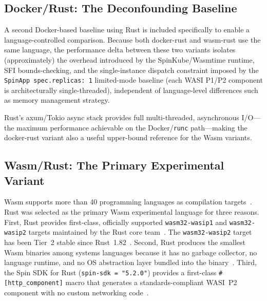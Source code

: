 \subsection{Docker/Rust: The Deconfounding Baseline}

\begin{sloppypar}
A second Docker-based baseline using Rust is included specifically to enable a language-controlled comparison. Because both docker-rust and wasm-rust use the same language, the performance delta between these two variants isolates (approximately) the overhead introduced by the SpinKube/Wasmtime runtime, \acs{SFI} bounds-checking, and the single-instance dispatch constraint imposed by the \texttt{SpinApp~spec.replicas:~1} limited-mode baseline (each \acs{WASI} P1/P2 component is architecturally single-threaded), independent of language-level differences such as memory management strategy.
\end{sloppypar}

\begin{sloppypar}
Rust's axum/Tokio async stack provides full multi-threaded, asynchronous I/O---the maximum performance achievable on the Docker/\texttt{runc} path---making the docker-rust variant also a useful upper-bound reference for the \acs{Wasm} variants.
\end{sloppypar}

\subsection{Wasm/Rust: The Primary Experimental Variant}

\begin{sloppypar}
\acs{Wasm} supports more than 40 programming languages as compilation targets~\cite{fermyon2024langmatrix}. Rust was selected as the primary \acs{Wasm} experimental language for three reasons. First, Rust provides first-class, officially supported \texttt{wasm32-wasip1} and \texttt{wasm32-wasip2} targets maintained by the Rust core team~\cite{rustblogwasip2}. The \texttt{wasm32-wasip2} target has been Tier~2 stable since Rust~1.82~\cite{rustblogwasip2}. Second, Rust produces the smallest \acs{Wasm} binaries among systems languages because it has no garbage collector, no language runtime, and no \acs{OS} abstraction layer bundled into the binary~\cite{chiarlone2024serverside}. Third, the Spin \acs{SDK} for Rust (\texttt{spin-sdk~=~"5.2.0"}) provides a first-class \texttt{\#[http\_component]} macro that generates a standards-compliant \acs{WASI}~P2 component with no custom networking code~\cite{spinframework2024rust}.
\end{sloppypar}

